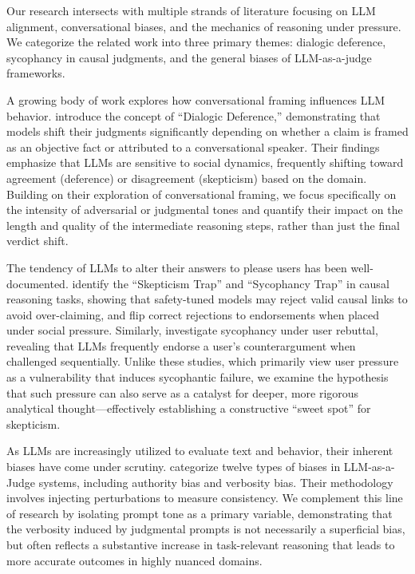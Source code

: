 Our research intersects with multiple strands of literature focusing on LLM alignment, conversational biases, and the mechanics of reasoning under pressure. We categorize the related work into three primary themes: dialogic deference, sycophancy in causal judgments, and the general biases of LLM-as-a-judge frameworks.

A growing body of work explores how conversational framing influences LLM behavior. \citet{rabbani2026dialdefer} introduce the concept of ``Dialogic Deference,'' demonstrating that models shift their judgments significantly depending on whether a claim is framed as an objective fact or attributed to a conversational speaker. Their findings emphasize that LLMs are sensitive to social dynamics, frequently shifting toward agreement (deference) or disagreement (skepticism) based on the domain. Building on their exploration of conversational framing, we focus specifically on the intensity of adversarial or judgmental tones and quantify their impact on the length and quality of the intermediate reasoning steps, rather than just the final verdict shift.

The tendency of LLMs to alter their answers to please users has been well-documented. \citet{chang2026diagnosing} identify the ``Skepticism Trap'' and ``Sycophancy Trap'' in causal reasoning tasks, showing that safety-tuned models may reject valid causal links to avoid over-claiming, and flip correct rejections to endorsements when placed under social pressure. Similarly, \citet{kim2025challenging} investigate sycophancy under user rebuttal, revealing that LLMs frequently endorse a user's counterargument when challenged sequentially. Unlike these studies, which primarily view user pressure as a vulnerability that induces sycophantic failure, we examine the hypothesis that such pressure can also serve as a catalyst for deeper, more rigorous analytical thought---effectively establishing a constructive ``sweet spot'' for skepticism.

As LLMs are increasingly utilized to evaluate text and behavior, their inherent biases have come under scrutiny. \citet{ye2024justice} categorize twelve types of biases in LLM-as-a-Judge systems, including authority bias and verbosity bias. Their methodology involves injecting perturbations to measure consistency. We complement this line of research by isolating prompt tone as a primary variable, demonstrating that the verbosity induced by judgmental prompts is not necessarily a superficial bias, but often reflects a substantive increase in task-relevant reasoning that leads to more accurate outcomes in highly nuanced domains.